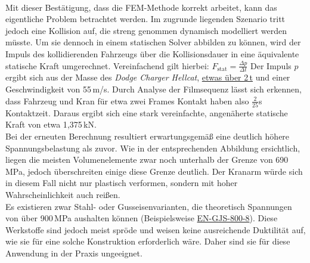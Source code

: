 \\
Mit dieser Bestätigung, dass die FEM-Methode korrekt arbeitet, kann das eigentliche Problem betrachtet werden. Im zugrunde liegenden Szenario tritt jedoch eine Kollision auf, die streng genommen dynamisch modelliert werden müsste. Um sie dennoch in einem statischen Solver abbilden zu können, wird der Impuls des kollidierenden Fahrzeugs über die Kollisionsdauer in eine äquivalente statische Kraft umgerechnet. Vereinfachend gilt hierbei:
$ F_\text{stat} = \frac{\Delta p}{\Delta t}$
Der Impuls $p$ ergibt sich aus der Masse des \textit{Dodge Charger Hellcat}, \href{https://www.auto-data.net/en/dodge-charger-vii-ld-facelift-2019-srt-hellcat-redeye-6.2-v8-797hp-widebody-automatic-45690}{etwas über 2\,t} und einer Geschwindigkeit von 55\,m/s. Durch Analyse der Filmsequenz lässt sich erkennen, dass Fahrzeug und Kran für etwa zwei Frames Kontakt haben also $\tfrac{2}{25}$s Kontaktzeit. Daraus ergibt sich eine stark vereinfachte, angenäherte statische Kraft von etwa 1{,}375\,kN. 
\\
Bei der erneuten Berechnung resultiert erwartungsgemäß eine deutlich höhere Spannungsbelastung als zuvor. Wie in der entsprechenden Abbildung ersichtlich, liegen die meisten Volumenelemente zwar noch unterhalb der Grenze von 690\,MPa, jedoch überschreiten einige diese Grenze deutlich. Der Kranarm würde sich in diesem Fall nicht nur plastisch verformen, sondern mit hoher Wahrscheinlichkeit auch reißen. 
\\
Es existieren zwar Stahl- oder Gusseisenvarianten, die theoretisch Spannungen von über 900\,MPa aushalten können (Beispielsweise \href{https://www.steelnumber.com/en/steel_composition_eu.php?name_id=1549}{EN-GJS-800-8}). Diese Werkstoffe sind jedoch meist spröde und weisen keine ausreichende Duktilität auf, wie sie für eine solche Konstruktion erforderlich wäre. Daher sind sie für diese Anwendung in der Praxis ungeeignet.


